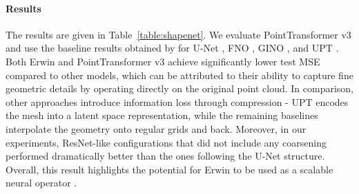 \paragraph{Results}
The results are given in Table~\ref{table:shapenet}. We evaluate PointTransformer v3 and use the baseline results obtained by \citet{alkin2024upt} for U-Net \cite{Ronneberger2015UNetCN}, FNO \cite{Li2020FourierNO}, GINO \cite{Li2023GeometryInformedNO}, and UPT \cite{alkin2024upt}. Both Erwin and PointTransformer v3 achieve significantly lower test MSE compared to other models, which can be attributed to their ability to capture fine geometric details by operating directly on the original point cloud. In comparison, other approaches introduce information loss through compression - UPT encodes the mesh into a latent space representation, while the remaining baselines interpolate the geometry onto regular grids and back. Moreover, in our experiments, ResNet-like configurations that did not include any coarsening performed dramatically better than the ones following the U-Net structure. Overall, this result highlights the potential for Erwin to be used as a scalable neural operator \cite{Wang2024CViTCV}.


